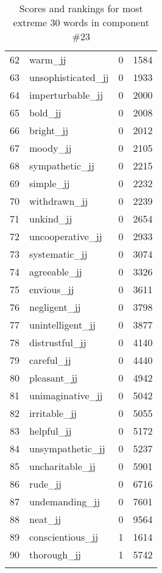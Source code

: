 \begin{longtable}[!htbp]{| rlr@{.}l |}
    62 & warm\_jj & 0 & 1584 \\
    63 & unsophisticated\_jj & 0 & 1933 \\
    64 & imperturbable\_jj & 0 & 2000 \\
    65 & bold\_jj & 0 & 2008 \\
    66 & bright\_jj & 0 & 2012 \\
    67 & moody\_jj & 0 & 2105 \\
    68 & sympathetic\_jj & 0 & 2215 \\
    69 & simple\_jj & 0 & 2232 \\
    70 & withdrawn\_jj & 0 & 2239 \\
    71 & unkind\_jj & 0 & 2654 \\
    72 & uncooperative\_jj & 0 & 2933 \\
    73 & systematic\_jj & 0 & 3074 \\
    74 & agreeable\_jj & 0 & 3326 \\
    75 & envious\_jj & 0 & 3611 \\
    76 & negligent\_jj & 0 & 3798 \\
    77 & unintelligent\_jj & 0 & 3877 \\
    78 & distrustful\_jj & 0 & 4140 \\
    79 & careful\_jj & 0 & 4440 \\
    80 & pleasant\_jj & 0 & 4942 \\
    81 & unimaginative\_jj & 0 & 5042 \\
    82 & irritable\_jj & 0 & 5055 \\
    83 & helpful\_jj & 0 & 5172 \\
    84 & unsympathetic\_jj & 0 & 5237 \\
    85 & uncharitable\_jj & 0 & 5901 \\
    86 & rude\_jj & 0 & 6716 \\
    87 & undemanding\_jj & 0 & 7601 \\
    88 & neat\_jj & 0 & 9564 \\
    89 & conscientious\_jj & 1 & 1614 \\
    90 & thorough\_jj & 1 & 5742 \\
    \hline
    \caption{Scores and rankings for most extreme 30 words in component \#23} \\
\end{longtable}
